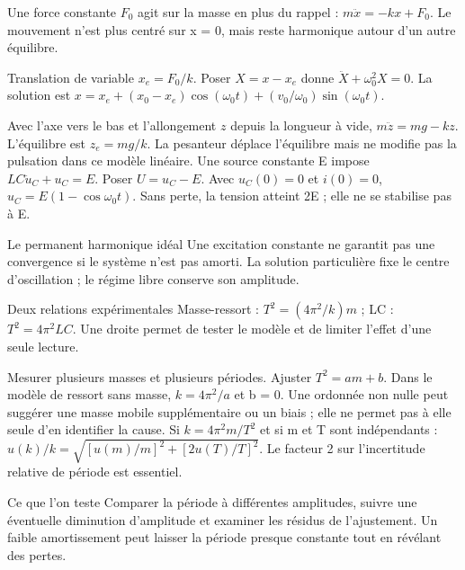 Une force constante $F_0$ agit sur la masse en plus du rappel : $m\ddot x=-kx+F_0$. Le mouvement n’est plus centré sur x = 0, mais reste harmonique autour d’un autre équilibre.
\begin{loi}{Translation de variable}
$x_e=F_0/k$. Poser $X=x-x_e$ donne $\ddot X+\omega_0^2X=0$. La solution est $x=x_e+(x_0-x_e)\cos(\omega_0t)+(v_0/\omega_0)\sin(\omega_0t)$.
\end{loi}
Avec l’axe vers le bas et l’allongement $z$ depuis la longueur à vide, $m\ddot z=mg-kz$. L’équilibre est $z_e=mg/k$. La pesanteur déplace l’équilibre mais ne modifie pas la pulsation dans ce modèle linéaire.
Une source constante E impose $LC\ddot u_C+u_C=E$. Poser $U=u_C-E$. Avec $u_C(0)=0$ et $i(0)=0$, $u_C=E(1-\cos\omega_0t)$. Sans perte, la tension atteint 2E ; elle ne se stabilise pas à E.
\begin{piege}{Le permanent harmonique idéal}
Une excitation constante ne garantit pas une convergence si le système n’est pas amorti. La solution particulière fixe le centre d’oscillation ; le régime libre conserve son amplitude.
\end{piege}


\begin{loi}{Deux relations expérimentales}
Masse-ressort : $T^2=(4\pi^2/k)m$ ; LC : $T^2=4\pi^2LC$. Une droite permet de tester le modèle et de limiter l’effet d’une seule lecture.
\end{loi}
Mesurer plusieurs masses et plusieurs périodes. Ajuster $T^2=am+b$. Dans le modèle de ressort sans masse, $k=4\pi^2/a$ et b = 0. Une ordonnée non nulle peut suggérer une masse mobile supplémentaire ou un biais ; elle ne permet pas à elle seule d’en identifier la cause.
Si $k=4\pi^2m/T^2$ et si m et T sont indépendants : $u(k)/k=\sqrt{[u(m)/m]^2+[2u(T)/T]^2}$. Le facteur 2 sur l’incertitude relative de période est essentiel.
\begin{methode}{Ce que l’on teste}
Comparer la période à différentes amplitudes, suivre une éventuelle diminution d’amplitude et examiner les résidus de l’ajustement. Un faible amortissement peut laisser la période presque constante tout en révélant des pertes.
\end{methode}



